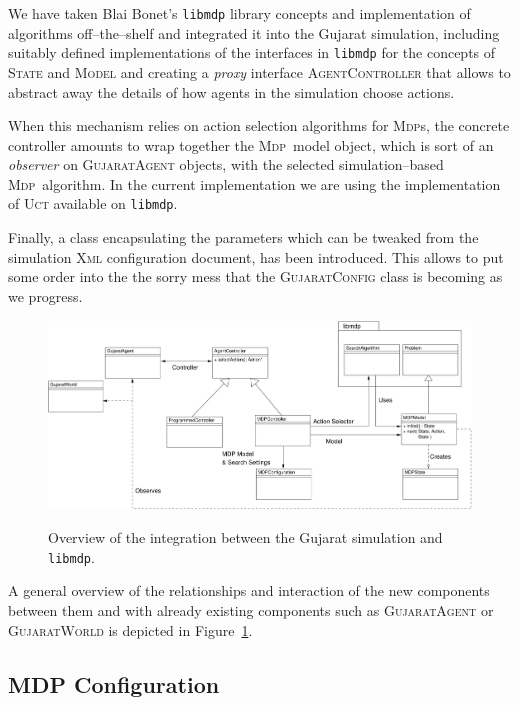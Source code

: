 \documentclass[a4paper,10pt]{article}
\newcommand{\mdp}{\textsc{Mdp}}
\newcommand{\mdps}{\textsc{Mdp}s}
\begin{document}
We have taken Blai Bonet's \texttt{libmdp} library concepts and implementation of algorithms off--the--shelf and 
integrated it into the Gujarat simulation, including suitably defined implementations of the interfaces 
in \texttt{libmdp} for the concepts of \textsc{State} and \textsc{Model} and creating a \emph{proxy} interface
\textsc{AgentController} that allows to abstract away the details of how agents in the simulation choose actions.

When this mechanism relies on action selection algorithms for \mdps, the concrete controller amounts to wrap together
the \mdp~model object, which is sort of an \emph{observer} on \textsc{GujaratAgent} objects, with the selected
simulation--based \mdp~algorithm. In the current implementation we are using the implementation of \textsc{Uct} available
on \texttt{libmdp}.

Finally, a class encapsulating the parameters which can be tweaked from the simulation \textsc{Xml} configuration
document, has been introduced. This allows to put some order into the the sorry mess that the \textsc{GujaratConfig}
class is becoming as we progress.

\begin{figure}[htbp]
\centering
\includegraphics[scale=0.65,keepaspectratio,angle=90]{static-view.pdf}
\label{static-view}
\caption{Overview of the integration between the Gujarat simulation and \texttt{libmdp}.}
\end{figure}

A general overview of the relationships and interaction of the new components between them and with already existing
components such as \textsc{GujaratAgent} or \textsc{GujaratWorld} is depicted in Figure~\ref{static-view}.

\subsection{MDP Configuration}
\end{document}
